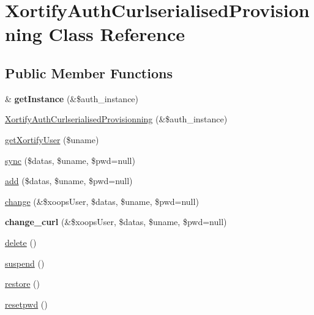 \hypertarget{class_xortify_auth_curlserialised_provisionning}{\section{Xortify\-Auth\-Curlserialised\-Provisionning Class Reference}
\label{class_xortify_auth_curlserialised_provisionning}
}
\subsection*{Public Member Functions}
\begin{DoxyCompactItemize}
\item 
\hypertarget{class_xortify_auth_curlserialised_provisionning_af4a184957000d9a38e808d0016f63d24}{\& {\bfseries get\-Instance} (\&\$auth\-\_\-instance)}\label{class_xortify_auth_curlserialised_provisionning_af4a184957000d9a38e808d0016f63d24}

\item 
\hyperlink{class_xortify_auth_curlserialised_provisionning_a84e9580a5726b9848555d07a3fb0c5ea}{Xortify\-Auth\-Curlserialised\-Provisionning} (\&\$auth\-\_\-instance)
\item 
\hyperlink{class_xortify_auth_curlserialised_provisionning_af051e88f190d80d9b0d040421b9db886}{get\-Xortify\-User} (\$uname)
\item 
\hyperlink{class_xortify_auth_curlserialised_provisionning_ad11492608a99310741acd1a8f3b75646}{sync} (\$datas, \$uname, \$pwd=null)
\item 
\hyperlink{class_xortify_auth_curlserialised_provisionning_a49a778f56279e3cbe3122873cc74db1f}{add} (\$datas, \$uname, \$pwd=null)
\item 
\hyperlink{class_xortify_auth_curlserialised_provisionning_a53853d0f7bd532dc975875d46757b55e}{change} (\&\$xoops\-User, \$datas, \$uname, \$pwd=null)
\item 
\hypertarget{class_xortify_auth_curlserialised_provisionning_a444fb47736f30d532f16a562717912ec}{{\bfseries change\-\_\-curl} (\&\$xoops\-User, \$datas, \$uname, \$pwd=null)}\label{class_xortify_auth_curlserialised_provisionning_a444fb47736f30d532f16a562717912ec}

\item 
\hyperlink{class_xortify_auth_curlserialised_provisionning_a50a108399952018b6748b4864cf38592}{delete} ()
\item 
\hyperlink{class_xortify_auth_curlserialised_provisionning_a6df16ac3bc542b55fc8d86c14216e392}{suspend} ()
\item 
\hyperlink{class_xortify_auth_curlserialised_provisionning_a6edbe05d8630b2e1ed069c16ebe785b5}{restore} ()
\item 
\hyperlink{class_xortify_auth_curlserialised_provisionning_a9533171a896f7075ed6c0e94301663a4}{resetpwd} ()
\end{DoxyCompactItemize}
